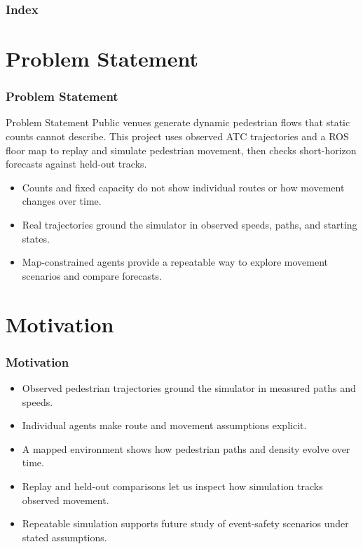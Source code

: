 \documentclass[aspectratio=43]{beamer}
\begin{document}
\begin{frame}\frametitle{Index}\tableofcontents\end{frame}

\section{Problem Statement}
\begin{frame}\frametitle{Problem Statement}
\large
\begin{block}{Problem Statement}
Public venues generate dynamic pedestrian flows that static counts cannot describe. This project uses observed ATC trajectories and a ROS floor map to replay and simulate pedestrian movement, then checks short-horizon forecasts against held-out tracks.
\end{block}
\vspace{0.12cm}
\begin{itemize}
\setlength\itemsep{0.18cm}
\item Counts and fixed capacity do not show individual routes or how movement changes over time.
\item Real trajectories ground the simulator in observed speeds, paths, and starting states.
\item Map-constrained agents provide a repeatable way to explore movement scenarios and compare forecasts.
\end{itemize}
\end{frame}

\section{Motivation}
\begin{frame}\frametitle{Motivation}
\large
\begin{itemize}
\setlength\itemsep{0.22cm}
\item Observed pedestrian trajectories ground the simulator in measured paths and speeds.
\item Individual agents make route and movement assumptions explicit.
\item A mapped environment shows how pedestrian paths and density evolve over time.
\item Replay and held-out comparisons let us inspect how simulation tracks observed movement.
\item Repeatable simulation supports future study of event-safety scenarios under stated assumptions.
\end{itemize}
\end{frame}
\end{document}
